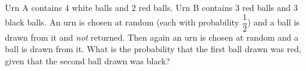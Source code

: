 Urn A contains $4$ white balls and $2$ red balls. Urn B contains $3$ red balls and $3$ black balls. An urn is chosen at random (each with probability $\dfrac{1}{2}$) and a ball is drawn from it and \emph{not} returned. Then again an urn is chosen at random and a ball is drawn from it. What is the probability that the first ball drawn was red, given that the second ball drawn was black?
